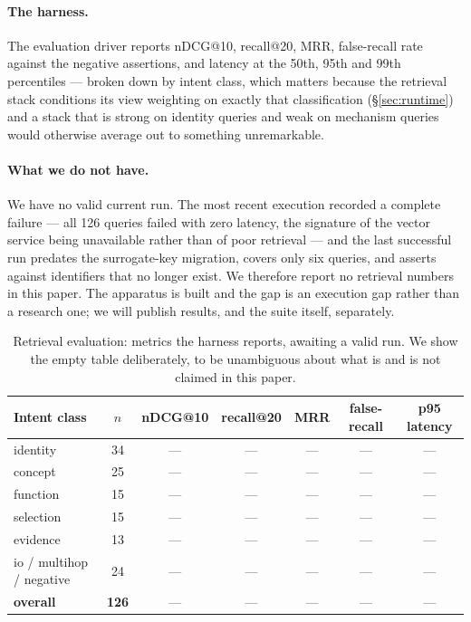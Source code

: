 \documentclass[10pt,a4paper]{article}
\begin{document}
\paragraph{The harness.} The evaluation driver reports nDCG@10, recall@20, MRR,
false-recall rate against the negative assertions, and latency at the 50th, 95th
and 99th percentiles --- broken down by intent class, which matters because the
retrieval stack conditions its view weighting on exactly that classification
(\S\ref{sec:runtime}) and a stack that is strong on identity queries and weak on
mechanism queries would otherwise average out to something unremarkable.

\paragraph{What we do not have.} We have no valid current run. The most recent
execution recorded a complete failure --- all 126 queries failed with zero
latency, the signature of the vector service being unavailable rather than of
poor retrieval --- and the last successful run predates the surrogate-key
migration, covers only six queries, and asserts against identifiers that no
longer exist. We therefore report no retrieval numbers in this paper. The
apparatus is built and the gap is an execution gap rather than a research one;
we will publish results, and the suite itself, separately.

\begin{table}[htbp]
\centering\small
\caption{Retrieval evaluation: metrics the harness reports, awaiting a valid run.
We show the empty table deliberately, to be unambiguous about what is and is not
claimed in this paper.}
\label{tab:evalpending}
\begin{tabular}{@{}lcccccc@{}}
\toprule
Intent class & $n$ & nDCG@10 & recall@20 & MRR & false-recall & p95 latency \\
\midrule
identity & 34 & --- & --- & --- & --- & --- \\
concept & 25 & --- & --- & --- & --- & --- \\
function & 15 & --- & --- & --- & --- & --- \\
selection & 15 & --- & --- & --- & --- & --- \\
evidence & 13 & --- & --- & --- & --- & --- \\
io / multihop / negative & 24 & --- & --- & --- & --- & --- \\
\midrule
\textbf{overall} & \textbf{126} & --- & --- & --- & --- & --- \\
\bottomrule
\end{tabular}
\end{table}
\end{document}
